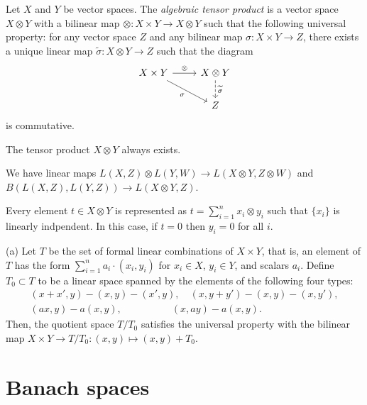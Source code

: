 \documentclass{../../large}
\begin{document}
\begin{prb}
Let $X$ and $Y$ be vector spaces.
The \emph{algebraic tensor product} is a vector space $X\otimes Y$ with a bilinear map $\otimes:X\times Y\to X\otimes Y$ such that the following universal property: for any vector space $Z$ and any bilinear map $\sigma:X\times Y\to Z$, there exists a unique linear map $\tilde\sigma:X\otimes Y\to Z$ such that the diagram
\[\begin{tikzcd}
X\times Y \ar{r}{\otimes}\ar[swap]{dr}{\sigma} & X\otimes Y \ar[dashed]{d}{\tilde\sigma}\\
\, & Z 
\end{tikzcd}\]
is commutative.
\begin{parts}
\item The tensor product $X\otimes Y$ always exists.
\item We have linear maps $L(X,Z)\otimes L(Y,W)\to L(X\otimes Y,Z\otimes W)$ and $B(L(X,Z),L(Y,Z))\to L(X\otimes Y,Z)$.
\item Every element $t\in X\otimes Y$ is represented as $t=\sum_{i=1}^nx_i\otimes y_i$ such that $\{x_i\}$ is linearly indpendent. In this case, if $t=0$ then $y_i=0$ for all $i$.
\end{parts}
\end{prb}
\begin{pf}
(a)
Let $T$ be the set of formal linear combinations of $X\times Y$, that is, an element of $T$ has the form $\sum_{i=1}^na_i\cdot(x_i,y_i)$ for $x_i\in X$, $y_i\in Y$, and scalars $a_i$.
Define $T_0\subset T$ to be a linear space spanned by the elements of the following four types:
\begin{gather*}
(x+x',y)-(x,y)-(x',y),\quad (x,y+y')-(x,y)-(x,y'),\\
(ax,y)-a(x,y), \quad\qquad\qquad (x,ay)-a(x,y).
\end{gather*}
Then, the quotient space $T/T_0$ satisfies the universal property with the bilinear map $X\times Y\to T/T_0:(x,y)\mapsto(x,y)+T_0$.
\end{pf}

\begin{prb}

\end{prb}



\section{Banach spaces}
\end{document}
